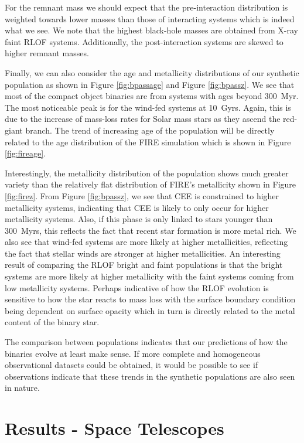 \documentclass{pas}
\begin{document}
For the remnant mass we should expect that the pre-interaction distribution is weighted towards lower masses than those of interacting systems which is indeed what we see. We note that the highest black-hole masses are obtained from X-ray faint RLOF systems. Additionally, the post-interaction systems are skewed to higher remnant masses.

Finally, we can also consider the age and metallicity distributions of our synthetic population as shown in Figure \ref{fig:bpassage} and Figure \ref{fig:bpassz}. We see that most of the compact object binaries are from systems with ages beyond 300~Myr. The most noticeable peak is for the wind-fed systems at 10~Gyrs. Again, this is due to the increase of mass-loss rates for Solar mass stars as they ascend the red-giant branch. The trend of increasing age of the population will be directly related to the age distribution of the \textsc{FIRE} simulation which is shown in Figure \ref{fig:fireage}.

Interestingly, the metallicity distribution of the population shows much greater variety than the relatively flat distribution of FIRE's metallicity shown in Figure \ref{fig:firez}. From Figure \ref{fig:bpassz}, we see that CEE is constrained to higher metallicity systems, indicating that CEE is likely to only occur for higher metallicity systems. Also,  if this phase is only linked to stars younger than 300~Myrs, this reflects the fact that recent star formation is more metal rich. We also see that wind-fed systems are more likely at higher metallicities, reflecting the fact that stellar winds are stronger at higher metallicities. An interesting result of comparing the RLOF bright and faint populations is that the bright systems are more likely at higher metallicity with the faint systems coming from low metallicity systems. Perhaps indicative of how the RLOF evolution is sensitive to how the star reacts to mass loss with the surface boundary condition being dependent on surface opacity which in turn is directly related to the metal content of the binary star. 

The comparison between populations indicates that our predictions of how the binaries evolve at least make sense. If more complete and homogeneous observational datasets could be obtained, it would be possible to see if observations indicate that these trends in the synthetic populations are also seen in nature.


\section{Results - Space Telescopes}\label{SpaceTeleResults}
\end{document}

